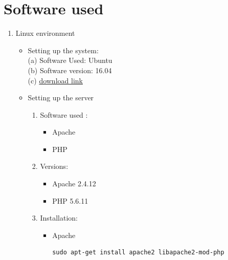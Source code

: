 \documentclass[a4paper,12pt,oneside]{book}
\begin{document}
\section{Software used}
\begin{enumerate}
  \item Linux environment
  		\begin{itemize}
  			\item Setting up the system:\\
  					(a) Software Used: Ubuntu\\
  					(b) Software version: 16.04\\
  					(c) \href{http://releases.ubuntu.com/16.04.1/ubuntu-16.04.1-desktop-amd64.iso}{download link} 
  					
  			\item  Setting up the server
  				\begin{enumerate}
  					\item Software used :
  						\begin{itemize}
  							\item Apache 
							\item PHP 
  						\end{itemize}
						
					\item Versions:
						\begin{itemize}
							\item Apache 2.4.12 
							\item PHP 5.6.11
						\end{itemize}
						
					\item Installation:
						\begin{itemize}
							\item Apache 
		                    \begin{verbatim}
sudo apt-get install apache2 libapache2-mod-php
		                    \end{verbatim}
		                    

\end{itemize}
\end{enumerate}
\end{itemize}
\end{enumerate}
\end{document}
